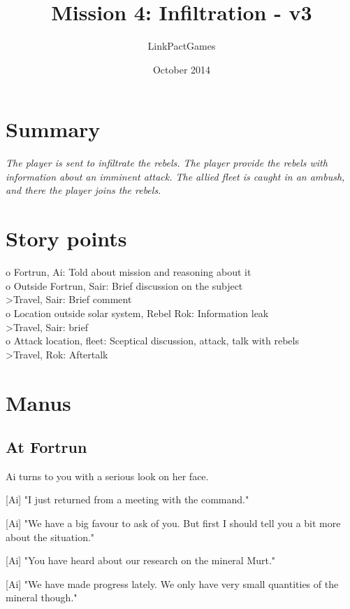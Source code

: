 \documentclass[a4paper,12pt]{article}
\begin{document}
\title{Mission 4: Infiltration - v3}
\author{LinkPactGames}
\date{October 2014}
\maketitle

\section{Summary}

\textit{The player is sent to infiltrate the rebels. The player provide
the rebels with information about an imminent attack. The allied
fleet is caught in an ambush, and there the player joins the rebels.}

\section{Story points}

o Fortrun, Ai: Told about mission and reasoning about it\\
o Outside Fortrun, Sair: Brief discussion on the subject\\
\textgreater Travel, Sair: Brief comment\\
o Location outside solar system, Rebel Rok: Information leak\\
\textgreater Travel, Sair: brief\\
o Attack location, fleet: Sceptical discussion, attack, talk with rebels\\
\textgreater Travel, Rok: Aftertalk

\section{Manus}

\subsection{At Fortrun}

Ai turns to you with a serious look on her face.

[Ai] "I just returned from a meeting with the command."

[Ai] "We have a big favour to ask of you. But first I should tell you a bit more
about the situation."

[Ai] "You have heard about our research on the mineral Murt." 

[Ai] "We have made progress lately. We only have very small quantities of the mineral though."
\end{document}
